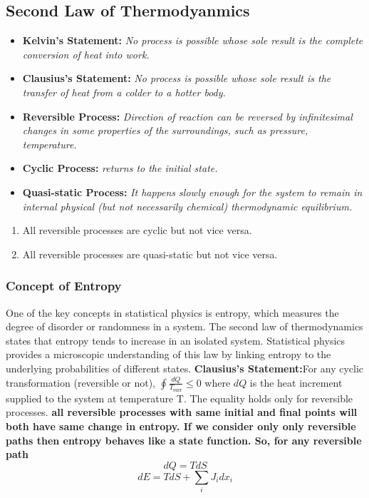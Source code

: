 \documentclass{article}
\begin{document}
\subsection{Second Law of Thermodyanmics}
\begin{itemize}
    \item \textbf{Kelvin's Statement:} \textit{No process is possible whose sole result is the complete conversion of heat into work.}
    \item \textbf{Clausius's Statement:} \textit{No process is possible whose sole result is the transfer of heat from a colder to a hotter body.}
    
    \item \textbf{Reversible Process:} \textit{Direction of reaction can be reversed by infinitesimal changes in some properties of the surroundings, such as pressure, temperature.}
    \item \textbf{Cyclic Process:} \textit{returns to the initial state.}
    
    \item \textbf{Quasi-static Process:} \textit{It happens slowly enough for the system to remain in internal physical (but not necessarily chemical)
thermodynamic equilibrium.}


\end{itemize}
\begin{enumerate}
    \item  All reversible processes are cyclic but not vice versa.
    \item All reversible processes are quasi-static but not vice versa.
\end{enumerate}

    


\subsubsection{Concept of Entropy}
One of the key concepts in statistical physics is entropy, which measures the degree of disorder or randomness in a system. The second law of thermodynamics states that entropy tends to increase in an isolated system. Statistical physics provides a microscopic understanding of this law by linking entropy to the underlying probabilities of different states.
\textbf{Clausius's Statement:}For any cyclic transformation (reversible or not), $\oint \frac{{dQ}}{{T_{\text{surr}}}} \leq 0 $ where $dQ$ is the heat increment supplied to the system at temperature T.
The equality holds only for reversible processes. 
\textbf{all reversible processes with same initial and final points will both have same change in entropy. If we consider only only reversible paths then entropy behaves like a state function. So,
for any reversible path}
$$dQ=TdS$$
$$dE = TdS + \sum_{i} J_i dx_i$$
\end{document}
